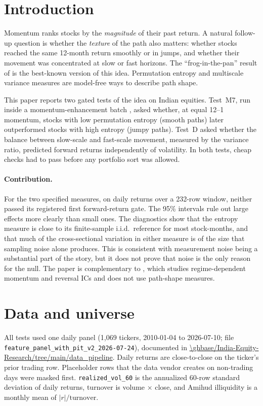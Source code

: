 \documentclass[11pt]{article}
\begin{document}
\section{Introduction}

Momentum ranks stocks by the \emph{magnitude} of their past return. A natural follow-up
question is whether the \emph{texture} of the path also matters: whether stocks reached
the same 12-month return smoothly or in jumps, and whether their movement was concentrated
at slow or fast horizons. The ``frog-in-the-pan'' result of \citet{da2014} is the
best-known version of this idea. Permutation entropy \citep{bandt2002} and multiscale
variance measures are model-free ways to describe path shape.

This paper reports two gated tests of the idea on Indian equities. Test~M7, run inside a
momentum-enhancement batch \citep{sahi_momentum}, asked whether, at equal 12--1 momentum,
stocks with low permutation entropy (smooth paths) later outperformed stocks with high
entropy (jumpy paths). Test~D asked whether the balance between slow-scale and fast-scale
movement, measured by the variance ratio, predicted forward returns independently of
volatility. In both tests, cheap checks had to pass before any portfolio sort was allowed.

\paragraph{Contribution.} For the two specified measures, on daily returns over a 232-row
window, neither passed its registered first forward-return gate. The 95\% intervals rule
out large effects more clearly than small ones. The diagnostics show that the entropy
measure is close to its finite-sample i.i.d.\ reference for most stock-months, and that
much of the cross-sectional variation in either measure is of the size that sampling noise
alone produces. This is consistent with measurement noise being a substantial part of
the story, but it does not prove that noise is the only reason for the null. The paper is
complementary to \citet{sahi_irfa}, which studies regime-dependent momentum and reversal
ICs and does not use path-shape measures.

\section{Data and universe}
\label{sec:data}

All tests used one daily panel (1,069 tickers, 2010-01-04 to 2026-07-10; file
\nolinkurl{feature_panel_with_pit_v2_2026-07-24}), documented in
\url{\ghbase/India-Equity-Research/tree/main/data_pipeline}. Daily returns are close-to-close on the ticker's prior
trading row. Placeholder rows that the data vendor creates on non-trading days were
masked first. \texttt{realized\_vol\_60} is the annualized 60-row standard deviation of
daily returns, turnover is volume $\times$ close, and Amihud illiquidity is a monthly mean
of $|r|/\text{turnover}$.
\end{document}
